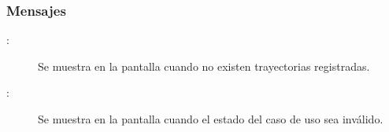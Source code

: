 \subsubsection{Mensajes}

	
\begin{description}
	\item[:] Se muestra en la pantalla  cuando no existen trayectorias registradas.
	\item[:] Se muestra en la pantalla   cuando el estado del caso de uso sea inválido.
\end{description}
